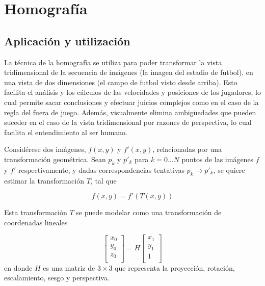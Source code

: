 \section{Homografía}
\label{sec:homography}

\subsection{Aplicación y utilización}

La técnica de la homografía se utiliza para poder transformar la vista
tridimensional de la secuencia de imágenes (la imagen del estadio de futbol), en
una vista de dos dimensiones (el campo de futbol visto desde arriba). Esto
facilita el análisis y los cálculos de las velocidades y posiciones de los
jugadores, lo cual permite sacar conclusiones y efectuar juicios complejos como
en el caso de la regla del fuera de juego. Además, visualmente elimina
ambigüedades que pueden suceder en el caso de la vista tridimensional por
razones de perspectiva, lo cual facilita el entendimiento al ser humano.

Considérese dos imágenes, $f(x,y)$ y $f'(x,y)$, relacionadas por una transformación geométrica. Sean $p_{k}$ y $p'_{k}$ para $k = 0 ... N$ puntos de las imágenes
$f$ y $f'$ respectivamente, y dadas correspondencias tentativas $p_{k} \to p'_{k}$, se quiere estimar la transformación $T$, tal que

\begin{equation}
    f(x,y) = f'(T(x,y))
\end{equation}

Esta transformación $T$ se puede modelar como una transformación de coordenadas lineales

\begin{equation}
    \begin{bmatrix}
        x_{0} \\
        y_{0} \\
        z_{0} \\
    \end{bmatrix}
    = H
    \begin{bmatrix}
        x_{1} \\
        y_{1} \\
        1 \\
    \end{bmatrix}
\end{equation}
en donde $H$ es una matriz de $3 \times 3$ que representa la proyección, rotación, escalamiento, sesgo y perspectiva.

